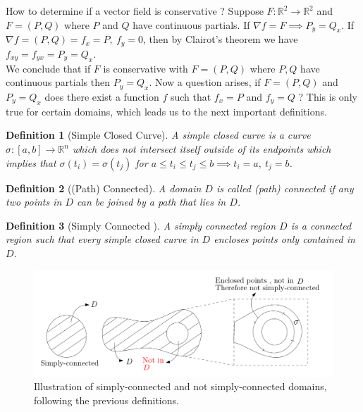 \documentclass[
	12pt,
	]{article}
\newcommand{\R}{\mathbb{R}}
\theoremstyle{custom}
\theoremstyle{custom}
\theoremstyle{custom}
\theoremstyle{custom}
\newtheorem{definition}{Definition}[section]
\theoremstyle{custom}
\theoremstyle{definition}
\theoremstyle{example}
\theoremstyle{note}
\theoremstyle{remark}
\theoremstyle{example}
\newcounter{theo}[section]\setcounter{theo}{0}
\numberwithin{equation}{subsection}
\begin{document}
  				\noindent How to determine if a vector field is conservative ? Suppose $F : \R^{2} \to \R^{2}$ and $F=(P,Q)$ where $P$ and $Q$ have continuous partials. If $\nabla f = F \implies P_y = Q_x$. If $\nabla f = (P,Q) = f_x = P , \ f_y=0$, then by Clairot's theorem we have $f_{xy} = f_{yx} = P_{y} = Q_{x}$.\\
  				
  				\noindent We conclude that if $F$ is conservative with $F= (P,Q)$ where $P,Q$ have continuous partials then $P_{y} = Q_{x}$. Now a question arises, if $F=(P,Q)$ and $P_{y} = Q_{x}$ does there exist a function $f$ such that $f_{x} = P $ and $f_{y} = Q$ ? This is only true for certain domains, which leads us to the next important definitions.
  				
  				\begin{definition}[Simple Closed Curve]
  					A simple closed curve is a curve $\sigma : [a,b] \to \R^{n}$ which does not intersect itself outside of its endpoints which implies that $\sigma(t_{i})= \sigma(t_{j})$ for $a \le t_{i} \le t_{j} \le b \implies t_{i} = a ,  \ t_{j} = b$.
  				
  				\end{definition}
  				
  				\begin{definition}[(Path) Connected]
  					A domain $D$ is called (path) connected if any two points in $D$ can be joined by a path that lies in $D$.
  				\end{definition}
  				
  				\begin{definition}[Simply Connected ]
  					A simply connected region $D$ is a connected region such that every simple closed curve in $D$ encloses points only contained in $D$. 
  				\end{definition}
  				\vspace{-0.5cm}
  				\begin{figure}[H]
  					\centering
  					\includegraphics[width=\linewidth]{MATH314_Notes_Triple_Integral_Example5_Figure.png}
  					\captionsetup{margin=1cm, justification=raggedright}\caption{Illustration of simply-connected and not simply-connected domains, following the previous definitions.}
  				\end{figure}
  				
\end{document}
